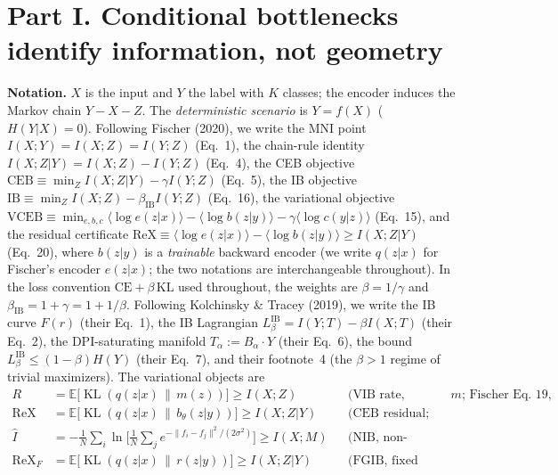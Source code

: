 \newtheorem{lemma}{Lemma}
\newtheorem{proposition}{Proposition}
\newtheorem{corollary}{Corollary}
\newtheorem{remark}{Remark}

\section*{Part I. Conditional bottlenecks identify information, not geometry}

\textbf{Notation.}
$X$ is the input and $Y$ the label with $K$ classes; the encoder induces the Markov chain
$Y - X - Z$. The \emph{deterministic scenario} is $Y = f(X)$ ($H(Y|X) = 0$). Following
Fischer (2020), we write the MNI point $I(X;Y) = I(X;Z) = I(Y;Z)$ (Eq.~1), the
chain-rule identity $I(X;Z|Y) = I(X;Z) - I(Y;Z)$ (Eq.~4), the CEB objective
$\mathrm{CEB} \equiv \min_Z I(X;Z|Y) - \gamma I(Y;Z)$ (Eq.~5), the IB objective
$\mathrm{IB} \equiv \min_Z I(X;Z) - \beta_{\mathrm{IB}} I(Y;Z)$ (Eq.~16), the
variational objective
$\mathrm{VCEB} \equiv \min_{e,b,c} \langle \log e(z|x)\rangle - \langle \log b(z|y)\rangle
- \gamma \langle \log c(y|z)\rangle$ (Eq.~15), and the residual certificate
$\mathrm{ReX} \equiv \langle \log e(z|x)\rangle - \langle \log b(z|y)\rangle
\ge I(X;Z|Y)$ (Eq.~20), where $b(z|y)$ is a \emph{trainable} backward encoder (we write
$q(z|x)$ for Fischer's encoder $e(z|x)$; the two notations are interchangeable
throughout). In the loss convention $\mathrm{CE} + \beta\,\mathrm{KL}$ used throughout, the weights are
$\beta = 1/\gamma$ and $\beta_{\mathrm{IB}} = 1 + \gamma = 1 + 1/\beta$. Following
Kolchinsky \& Tracey (2019), we write the IB curve $F(r)$ (their Eq.~1), the IB
Lagrangian $L^{\mathrm{IB}}_\beta = I(Y;T) - \beta I(X;T)$ (their Eq.~2), the
DPI-saturating manifold $T_\alpha := B_\alpha \cdot Y$ (their Eq.~6), the bound
$L^{\mathrm{IB}}_\beta \le (1-\beta)H(Y)$ (their Eq.~7), and their footnote~4 (the
$\beta > 1$ regime of trivial maximizers). The variational objects are
\begin{align*}
R &= \mathbb{E}\big[\operatorname{KL}(q(z|x)\,\|\,m(z))\big] \ge I(X;Z)
&&\text{(VIB rate, marginal prior $m$; Fischer Eq.~19, Alemi et al.\ Eq.~14)} \\
\mathrm{ReX} &= \mathbb{E}\big[\operatorname{KL}(q(z|x)\,\|\,b_\theta(z|y))\big]
\ge I(X;Z|Y)
&&\text{(CEB residual; Fischer Eq.~20)} \\
\widehat I &= -\frac{1}{N}\sum_i \ln\Big[\frac{1}{N}\sum_j
e^{-\|f_i-f_j\|^2/(2\sigma^2)}\Big] \ge I(X;M)
&&\text{(NIB, non-parametric; Eq.~16, the homoscedastic case of Eq.~10)} \\
\mathrm{ReX}_F &= \mathbb{E}\big[\operatorname{KL}(q(z|x)\,\|\,r(z|y))\big]
\ge I(X;Z|Y)
&&\text{(FGIB, fixed anchor)}
\end{align*}
